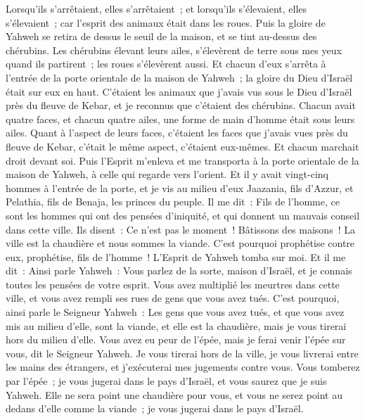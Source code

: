 \begin{multicols}{2}
Lorsqu'ils s'arrêtaient, elles s'arrêtaient~; et lorsqu'ils s'élevaient, elles s'élevaient~; car l'esprit des animaux était dans les roues.
Puis la gloire de Yahweh se retira de dessus le seuil de la maison, et se tint au-dessus des chérubins.
Les chérubins élevant leurs ailes, s'élevèrent de terre sous mes yeux quand ils partirent~; les roues s'élevèrent aussi. Et chacun d'eux s'arrêta à l'entrée de la porte orientale de la maison de Yahweh~; la gloire du Dieu d'Israël était sur eux en haut.
C'étaient les animaux que j'avais vus sous le Dieu d'Israël près du fleuve de Kebar, et je reconnus que c'étaient des chérubins.
Chacun avait quatre faces, et chacun quatre ailes, une forme de main d'homme était sous leurs ailes.
Quant à l'aspect de leurs faces, c'étaient les faces que j'avais vues près du fleuve de Kebar, c'était le même aspect, c'étaient eux-mêmes. Et chacun marchait droit devant soi.
\VerseOne{}Puis l'Esprit m'enleva et me transporta à la porte orientale de la maison de Yahweh, à celle qui regarde vers l'orient. Et il y avait vingt-cinq hommes à l'entrée de la porte, et je vis au milieu d'eux Jaazania, fils d'Azzur, et Pelathia, fils de Benaja, les princes du peuple.
Il me dit~: Fils de l'homme, ce sont les hommes qui ont des pensées d'iniquité, et qui donnent un mauvais conseil dans cette ville.
Ils disent~: Ce n'est pas le moment~! Bâtissons des maisons~! La ville est la chaudière et nous sommes la viande.
C'est pourquoi prophétise contre eux, prophétise, fils de l'homme~!
L'Esprit de Yahweh tomba sur moi. Et il me dit~: Ainsi parle Yahweh~: Vous parlez de la sorte, maison d'Israël, et je connais toutes les pensées de votre esprit.
Vous avez multiplié les meurtres dans cette ville, et vous avez rempli ses rues de gens que vous avez tués.
C'est pourquoi, ainsi parle le Seigneur Yahweh~: Les gens que vous avez tués, et que vous avez mis au milieu d'elle, sont la viande, et elle est la chaudière, mais je vous tirerai hors du milieu d'elle.
Vous avez eu peur de l'épée, mais je ferai venir l'épée sur vous, dit le Seigneur Yahweh.
Je vous tirerai hors de la ville, je vous livrerai entre les mains des étrangers, et j'exécuterai mes jugements contre vous.
Vous tomberez par l'épée~; je vous jugerai dans le pays d'Israël, et vous saurez que je suis Yahweh.
Elle ne sera point une chaudière pour vous, et vous ne serez point au dedans d'elle comme la viande~; je vous jugerai dans le pays d'Israël.

\end{multicols}
